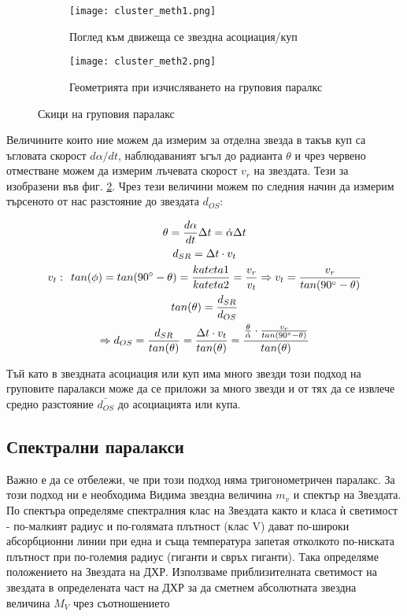 \documentclass[a4paper,12pt]{article}
\begin{document}
\begin{figure}
\centering
\begin{subfigure}{.5\textwidth}
  \centering
  \texttt{[image: cluster\_meth1.png]}
  \caption{Поглед към движеща се звездна асоциация/куп}
  \label{fig:cluster_meth1}
\end{subfigure}%
\begin{subfigure}{.5\textwidth}
  \centering
  \texttt{[image: cluster\_meth2.png]}
  \caption{Геометрията при изчисляването на груповия паралкс}
  \label{fig:cluster_meth2}
\end{subfigure}
\caption{Скици на груповия паралакс}
\label{fig:cluster_meth}
\end{figure}

Величините които ние можем да измерим за отделна звезда в такъв куп са ъгловата скорост $d\alpha/dt$, наблюдаваният ъгъл до радианта $\theta$ и чрез червено отместване можем да измерим лъчевата скорост $v_r$ на звездата. Тези за изобразени във фиг. \ref{fig:cluster_meth2}. Чрез тези величини можем по следния начин да измерим търсеното от нас разстояние до звездата $d_{OS}$:

\begin{gather}
    \theta = \frac{d \alpha}{dt} \Delta t = \dot{\alpha} \Delta t\\
    d_{SR} = \Delta t \cdot v_t\\
    v_t : \: \: tan(\phi) = tan(90 \degree - \theta) = \frac{kateta1}{kateta2} = \frac{v_r}{v_t} \Rightarrow v_t = \frac{v_r}{tan(90 \degree - \theta)}\\
    tan(\theta) = \frac{d_{SR}}{d_{OS}}\\
    \Rightarrow d_{OS} = \frac{d_{SR}}{tan(\theta)} = \frac{\Delta t \cdot v_t}{tan(\theta)} = \frac{ \frac{\theta}{\dot{\alpha}} \cdot \frac{v_r}{tan(90 \degree - \theta)}}{tan(\theta)}
\end{gather}

Тъй като в звездната асоциация или куп има много звезди този подход на груповите паралакси може да се приложи за много звезди и от тях да се извлече средно разстояние $\bar{d_{OS}}$ до асоциацията или купа.

\subsection{Спектрални паралакси}
\label{sec:spec_parallax}
Важно е да се отбележи, че при този подход няма тригонометричен паралакс. За този подход ни е необходима Видима звездна величина $m_v$ и спектър на Звездата. По спектъра определяме спектралния клас на Звездата както и класа ѝ светимост - по-малкият радиус и по-голямата плътност (клас V) дават по-широки абсорбционни линии при една и съща температура запетая отколкото по-ниската плътност при по-големия радиус (гиганти и свръх гиганти). Така определяме положението на Звездата на ДХР. Използваме приблизителната светимост на звездата в определената част на ДХР за да сметнем абсолютната звездна величина $M_V$ чрез съотношението
\end{document}
